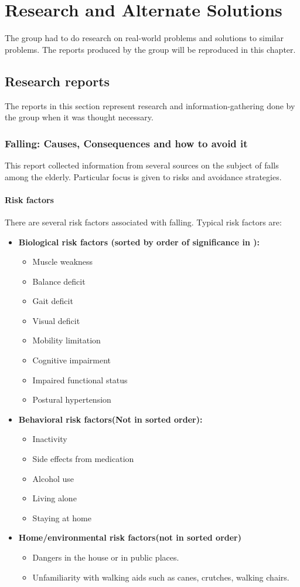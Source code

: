 \chapter{Research and Alternate Solutions}
The group had to do research on real-world problems and solutions to similar problems. The reports produced by the group will be reproduced in this chapter.
\section{Research reports}
The reports in this section represent research and information-gathering done by the group when it was thought necessary.
\subsection{Falling: Causes, Consequences and how to avoid it}
This report collected information from several sources on the subject of falls among the elderly. Particular focus is given to risks and avoidance strategies.
\subsubsection*{Risk factors}

There are several risk factors associated with falling. Typical risk factors are:
\begin{itemize}
\item 
\textbf{Biological risk factors (sorted by order of significance in  \cite{fallsRubenstein}):}
\begin{itemize}
\item Muscle weakness
\item Balance deficit
\item Gait deficit
\item Visual deficit
\item Mobility limitation
\item Cognitive impairment
\item Impaired functional status
\item Postural hypertension
\end{itemize}
\item 
\textbf{Behavioral risk factors(Not in sorted order):}
\begin{itemize}
\item Inactivity
\item Side effects from medication
\item Alcohol use
\item Living alone
\item Staying at home
\end{itemize}
\item 
\textbf{Home/environmental risk factors(not in sorted order)}
\begin{itemize}
\item Dangers in the house or in public places.
\item Unfamiliarity with walking aids such as canes, crutches, walking chairs.
\end{itemize}
\end{itemize}

